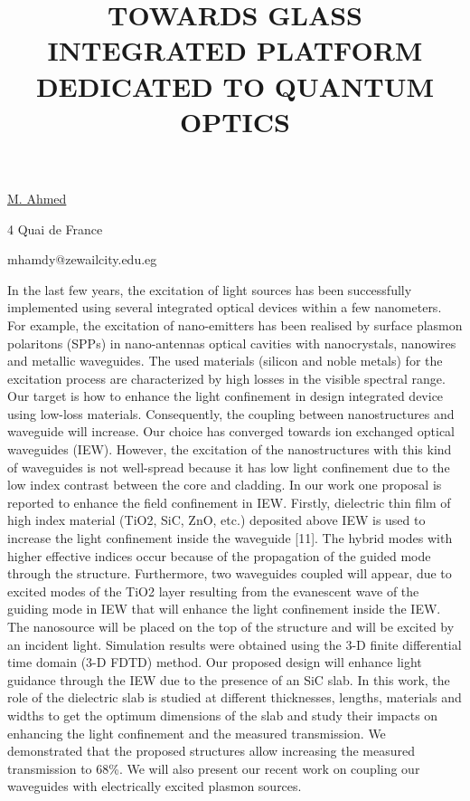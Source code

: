 \title{TOWARDS GLASS INTEGRATED PLATFORM DEDICATED TO QUANTUM OPTICS}

\underline{M. Ahmed}  

{\normalsize{\vspace{-4mm}
4 Quai de France



\email mhamdy@zewailcity.edu.eg}}

In the last few years, the excitation of light sources has been successfully implemented using several integrated optical devices within a few nanometers. For example, the excitation of nano-emitters has been realised by surface plasmon polaritons (SPPs) in nano-antennas optical cavities with nanocrystals, nanowires and metallic waveguides. The used materials (silicon and noble metals) for the excitation process are characterized by high losses in the visible spectral range. Our target is how to enhance the light confinement in design integrated device using low-loss materials. Consequently, the coupling between nanostructures and waveguide will increase. 
Our choice has converged towards ion exchanged optical waveguides (IEW). However, the excitation of the nanostructures with this kind of waveguides is not well-spread because it has low light confinement due to the low index contrast between the core and cladding. In our work one proposal is reported to enhance the field confinement in IEW. Firstly, dielectric thin film of high index material (TiO2, SiC, ZnO, etc.) deposited above IEW is used to increase the light confinement inside the waveguide [11]. The hybrid modes with higher effective indices occur because of the propagation of the guided mode through the structure. Furthermore, two waveguides coupled will appear, due to excited modes of the TiO2 layer resulting from the evanescent wave of the guiding mode in IEW that will enhance the light confinement inside the IEW. The nanosource will be placed on the top of the structure and will be excited by an incident light. 
Simulation results were obtained using the 3-D finite differential time domain (3-D FDTD) method. Our proposed design will enhance light guidance through the IEW due to the presence of an SiC slab. In this work, the role of the dielectric slab is studied at different thicknesses, lengths, materials and widths to get the optimum dimensions of the slab and study their impacts on enhancing the light confinement and the measured transmission. We demonstrated that the proposed structures allow increasing the measured transmission to 68\%. We will also present our recent work on coupling our waveguides with electrically excited plasmon sources.


\vspace{\baselineskip}